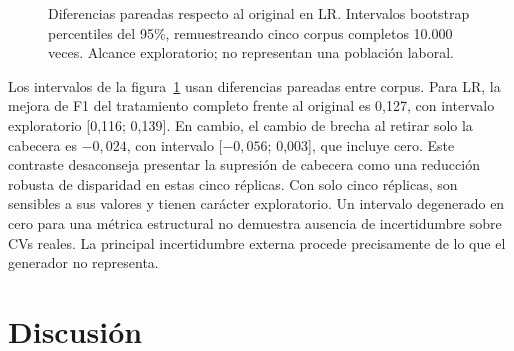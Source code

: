 \documentclass[11pt,a4paper,oneside]{report}
\begin{document}
\begin{figure}[htbp]\centering
{}
\caption[Diferencias pareadas respecto al original en LR]{Diferencias pareadas respecto al original en LR. Intervalos bootstrap percentiles del 95\%, remuestreando cinco corpus completos 10.000 veces. Alcance exploratorio; no representan una población laboral.}\label{fig:intervalos}\end{figure}

Los intervalos de la figura~\ref{fig:intervalos} usan diferencias pareadas entre corpus. Para LR, la mejora de F1 del tratamiento completo frente al original es 0,127, con intervalo exploratorio [0,116; 0,139]. En cambio, el cambio de brecha al retirar solo la cabecera es $-0,024$, con intervalo [$-0,056$; 0,003], que incluye cero. Este contraste desaconseja presentar la supresión de cabecera como una reducción robusta de disparidad en estas cinco réplicas. Con solo cinco réplicas, son sensibles a sus valores y tienen carácter exploratorio. Un intervalo degenerado en cero para una métrica estructural no demuestra ausencia de incertidumbre sobre CVs reales. La principal incertidumbre externa procede precisamente de lo que el generador no representa.
\chapter{Discusión}
\end{document}
